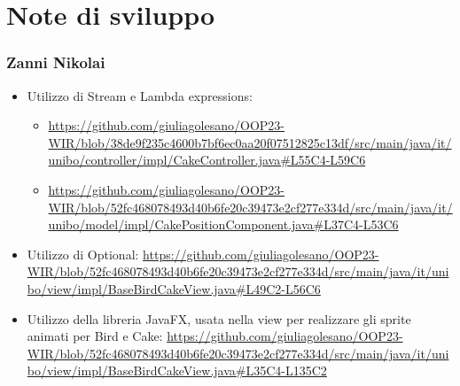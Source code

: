 \documentclass[a4paper,12pt]{report}
\begin{document}
\section{Note di sviluppo}
\subsubsection{Zanni Nikolai}
\begin{itemize}
    \item Utilizzo di Stream e Lambda expressions:
    \begin{itemize}
        \item \url{https://github.com/giuliagolesano/OOP23-WIR/blob/38de9f235c4600b7bf6ec0aa20f07512825c13df/src/main/java/it/unibo/controller/impl/CakeController.java#L55C4-L59C6}
        \item \url{https://github.com/giuliagolesano/OOP23-WIR/blob/52fc468078493d40b6fe20c39473e2cf277e334d/src/main/java/it/unibo/model/impl/CakePositionComponent.java#L37C4-L53C6}
    \end{itemize}
    \item Utilizzo di Optional:
    \url{https://github.com/giuliagolesano/OOP23-WIR/blob/52fc468078493d40b6fe20c39473e2cf277e334d/src/main/java/it/unibo/view/impl/BaseBirdCakeView.java#L49C2-L56C6}
    \item Utilizzo della libreria JavaFX, usata nella view per realizzare gli sprite animati per Bird e Cake:
    \url{https://github.com/giuliagolesano/OOP23-WIR/blob/52fc468078493d40b6fe20c39473e2cf277e334d/src/main/java/it/unibo/view/impl/BaseBirdCakeView.java#L35C4-L135C2}
\end{itemize}
\end{document}
